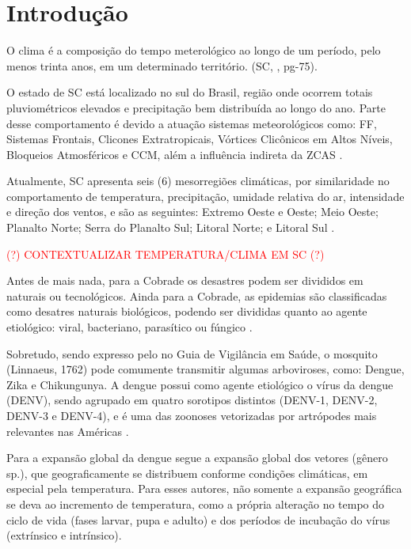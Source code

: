 \chapter{Introdução}

\indent O clima é a composição do tempo meterológico ao longo de um período, pelo menos trinta anos, em um determinado território. (\acrlong{SC}, \citeyear{AtlasSCnatureza}, pg-75).

\indent O estado de \acrfull{SC} está localizado no sul do Brasil, região onde ocorrem totais pluviométricos elevados e precipitação bem distribuída ao longo do ano. Parte desse comportamento é devido a atuação sistemas meteorológicos como: \acrfull{FF}, Sistemas Frontais, Clicones Extratropicais, Vórtices Clicônicos em Altos Níveis, Bloqueios Atmosféricos e \acrfull{CCM}, além a influência indireta da \acrfull{ZCAS} \cite{reboita2010}.

\indent Atualmente, \acrlong{SC} apresenta seis (6) mesorregiões climáticas, por similaridade no comportamento de temperatura, precipitação, umidade relativa do ar, intensidade e direção dos ventos, e são as seguintes: Extremo Oeste e Oeste; Meio Oeste; Planalto Norte; Serra do Planalto Sul; Litoral Norte; e Litoral Sul \cite{Guerra2023Regionalizacao}.

\textcolor{red}{(?) CONTEXTUALIZAR TEMPERATURA/CLIMA EM SC (?)}

\indent Antes de mais nada, para a \acrfull{Cobrade} os desastres podem ser divididos em naturais ou tecnológicos. Ainda para a \acrshort{Cobrade}, as epidemias são classificadas como desatres naturais biológicos, podendo ser divididas quanto ao agente etiológico: viral, bacteriano, parasítico ou fúngico \cite{GIRD}.

\indent Sobretudo, sendo expresso pelo  no Guia de Vigilância em Saúde, o mosquito  (Linnaeus, 1762) pode comumente transmitir algumas arboviroses, como: Dengue, Zika e Chikungunya. A dengue possui como agente etiológico o vírus da dengue (\acrfull{DENV}), sendo agrupado em quatro sorotipos distintos (\acrshort{DENV}-1, \acrshort{DENV}-2, \acrshort{DENV}-3 e \acrshort{DENV}-4), e é uma das zoonoses vetorizadas por artrópodes mais relevantes nas Américas \cite{GuiaVigSaúde22}.

\indent Para  a expansão global da dengue segue a expansão global dos vetores (gênero  sp.), que geograficamente se distribuem conforme condições climáticas, em especial pela temperatura. Para esses autores, não somente a expansão geográfica se deva ao incremento de temperatura, como a própria alteração no tempo do ciclo de vida (fases larvar, pupa e adulto) e dos períodos de incubação do vírus (extrínsico e intrínsico).

